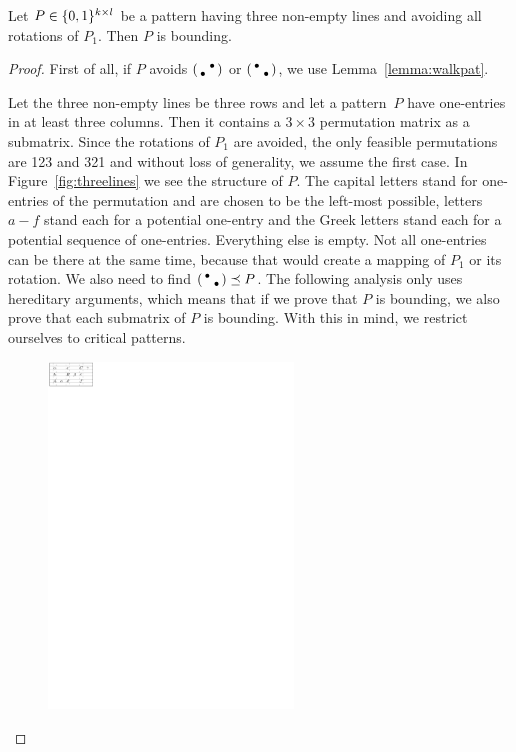 \begin{lemma}
Let $P\in\{0,1\}^{k\times l}$ be a pattern having three non-empty lines and avoiding all rotations of $P_1$. Then $P$ is bounding.
\end{lemma}
\begin{proof}
First of all, if $P$ avoids $\left(\begin{smallmatrix} &\bullet\\\bullet& \end{smallmatrix}\right)$ or $\left(\begin{smallmatrix}\bullet& \\ &\bullet\end{smallmatrix}\right)$, we use Lemma~\ref{lemma:walkpat}.

Let the three non-empty lines be three rows and let a pattern~$P$ have one-entries in at least three columns. Then it contains a $3\times3$ permutation matrix as a submatrix. Since the rotations of $P_1$ are avoided, the only feasible permutations are 123 and 321 and without loss of generality, we assume the first case. In Figure~\ref{fig:threelines} we see the structure of $P$. The capital letters stand for one-entries of the permutation and are chosen to be the left-most possible, letters $a-f$ stand each for a potential one-entry and the Greek letters stand each for a potential sequence of one-entries. Everything else is empty. Not all one-entries can be there at the same time, because that would create a mapping of $P_1$ or its rotation. We also need to find $\left(\begin{smallmatrix}\bullet& \\ &\bullet\end{smallmatrix}\right)\preceq P$. The following analysis only uses hereditary arguments, which means that if we prove that $P$ is bounding, we also prove that each submatrix of $P$ is bounding. With this in mind, we restrict ourselves to critical patterns.
\begin{figure}[!ht]
	\centering
	\includegraphics[width=65mm]{img/threelines.pdf}

\end{figure}
\end{proof}

